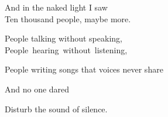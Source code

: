 And in the naked light I saw \\ Ten thousand people, maybe more.

      People talking without speaking, \\
      People~hearing~without~listening,

People writing
songs that voices never share \par And no one dared

Disturb      the        sound        of       silence.